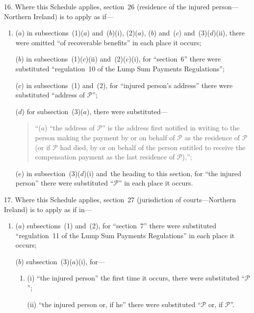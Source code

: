 \documentclass[12pt,a4paper]{article}
\begin{document}
16.  Where this Schedule applies, section~26 (residence of the injured person---Northern Ireland) is to apply as if—
\begin{enumerate}\item[]
($a$) in subsections~(1)($a$)  and~($b$)(i), (2)($a$), ($b$)  and~($c$)  and~(3)($d$)(ii), there were omitted “of recoverable benefits” in each place it occurs;

($b$) in subsections~(1)($c$)(ii)  and~(2)($c$)(i), for “section~6” there were substituted “regulation~10 of the Lump Sum Payments Regulations”;

($c$) in subsections~(1) and~(2), for “injured person’s address” there were substituted “address of $\mathcal{P}$”;

($d$) for subsection~(3)($a$), there were substituted—
\begin{quotation}
“($a$) “the address of $\mathcal{P}$” is the address first notified in writing to the person making the payment by or on behalf of $\mathcal{P}$ as the residence of $\mathcal{P}$ (or if $\mathcal{P}$ had died, by or on behalf of the person entitled to receive the compensation payment as the last residence of $\mathcal{P}$),”;
\end{quotation}

($e$) in subsection~(3)($d$)(i)  and~the heading to this section, for “the injured person” there were substituted “$\mathcal{P}$” in each place it occurs.
\end{enumerate}

\medskip

17.  Where this Schedule applies, section~27 (jurisdiction of courts---Northern Ireland) is to apply as if in—
\begin{enumerate}\item[]
($a$) subsections~(1) and~(2), for “section~7” there were substituted “regulation~11 of the Lump Sum Payments Regulations” in each place it occurs;

($b$) subsection~(3)($a$)(i), for—
\begin{enumerate}\item[]
(i) “the injured person” the first time it occurs, there were substituted “$\mathcal{P}$”;

(ii) “the injured person or, if he” there were substituted “$\mathcal{P}$ or, if $\mathcal{P}$”.
\end{enumerate}
\end{enumerate}

\medskip
\end{document}
